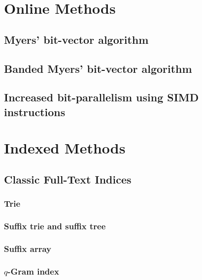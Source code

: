 \chapter{Online Methods}
\section{Myers' bit-vector algorithm}
\section{Banded Myers' bit-vector algorithm}
\section{Increased bit-parallelism using SIMD instructions}

\chapter{Indexed Methods}
\section{Classic Full-Text Indices}
\subsection{Trie}
\subsection{Suffix trie and suffix tree}
\subsection{Suffix array}
\subsection{$q$-Gram index}
